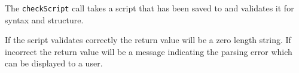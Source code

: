 The \verb+checkScript+ call takes a script that has been saved to \Rapture and validates it for
syntax and structure.

If the script validates correctly the return value will be a zero length string. If incorrect the return
value will be a message indicating the parsing error which can be displayed to a user.
